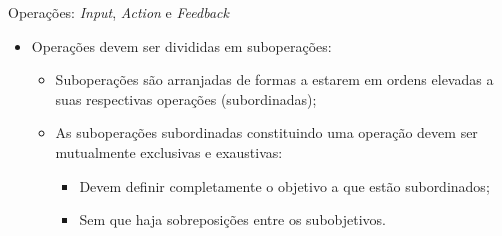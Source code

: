 \documentclass[xcolor=dvipsnames]{beamer}
\let\olditem=\item%
\renewcommand{\item}{\olditem \justifying}%
\begin{document}
\begin{frame}{Operações: \textit{Input}, \textit{Action} e \textit{Feedback}}

	\begin{itemize}

        
		\item Operações devem ser divididas em suboperações:
        
        \bigskip
        
		\begin{itemize}
        
			\item Suboperações são arranjadas de formas a estarem em ordens elevadas a suas respectivas operações (subordinadas);
            
            \bigskip
            
			\item As suboperações subordinadas constituindo uma operação devem ser mutualmente exclusivas e exaustivas:
            
            \bigskip
            
			\begin{itemize}
            
				\item Devem definir completamente o objetivo a que estão subordinados;
                
                \bigskip
                
				\item Sem que haja sobreposições entre os subobjetivos.
                
			\end{itemize}
            
		\end{itemize}      
		
	\end{itemize}
    
\end{frame}
\end{document}
